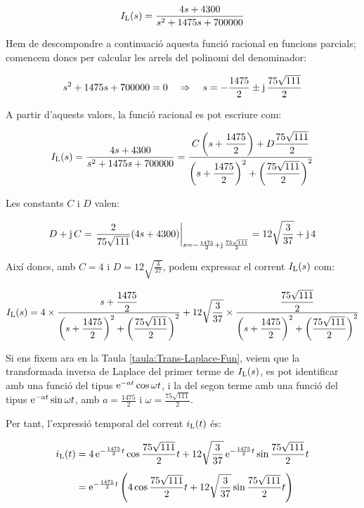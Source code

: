 \begin{exemple}
    \[
    I_\mathrm{L}(s) = \frac{4 s+ 4300}{s^2 +1475 s + 700000}
    \]

    Hem de descompondre a continuació aquesta funció racional en
    funcions parcials; comencem doncs per calcular les arrels del
    polinomi del denominador:

    \[
    s^2 +1475 s + 700000 = 0 \quad\Rightarrow\quad s= -\frac{1475}{2}
    \pm \mathrm{j}\,\frac{75\sqrt{111}}{2}
    \]

    A partir d'aquests valors, la  funció racional es pot escriure com:

    \[
        I_\mathrm{L}(s) =
        \frac{4 s+ 4300}{s^2 +1475 s + 700000} =
        \frac{C\left(s+\dfrac{1475}{2}\right)+D\dfrac{75\sqrt{111}}{2}}
        {\left(s+\dfrac{1475}{2}\right)^2+\left(\dfrac{75\sqrt{111}}{2}\right)^2}
    \]

    Les constants $C$ i $D$ valen:

    \[
    D + \mathrm{j}\,C = \left.\frac{2}{75\sqrt{111}}(4 s
    +4300)\right|_{s=-\frac{1475}{2} + \mathrm{j}\,\frac{75\sqrt{111}}{2}}=
    12\sqrt{\frac{3}{37}} +\mathrm{j}\,4
    \]

    Així doncs, amb $C=4$ i $D=12\sqrt{\frac{3}{37}}$, podem expressar
    el corrent $I_\mathrm{L}(s)$ com:

    \[
        I_\mathrm{L}(s) = 4\times\frac{s+\dfrac{1475}{2}}
        {\left(s+\dfrac{1475}{2}\right)^2+\left(\dfrac{75\sqrt{111}}{2}\right)^2}
        + 12\sqrt{\frac{3}{37}}\times\frac{\dfrac{75\sqrt{111}}{2}}
        {\left(s+\dfrac{1475}{2}\right)^2+\left(\dfrac{75\sqrt{111}}{2}\right)^2}
    \]


     Si ens fixem ara en la Taula \vref{taula:Trans-Laplace-Fun},
    veiem que la transformada inversa de Laplace del primer terme de
    $I_\mathrm{L}(s)$, es pot identificar amb una funció del tipus
    $\mathrm{e}^{-at}\cos\omega t$, i la del segon terme amb una funció del tipus
    $\mathrm{e}^{-at}\sin\omega t$, amb $a=\frac{1475}{2}$ i
    $\omega=\frac{75\sqrt{111}}{2}$.

    Per tant, l'expressió temporal del corrent $i_\mathrm{L}(t)$ és:

    \[\begin{split}
        i_\mathrm{L}(t) &= 4\, \mathrm{e}^{-\frac{1475}{2}t} \cos \frac{75\sqrt{111}}{2} t +
        12\sqrt{\frac{3}{37}}\, \mathrm{e}^{-\frac{1475}{2}t} \sin
        \frac{75\sqrt{111}}{2}t  \\[1ex] &= \mathrm{e}^{-\frac{1475}{2}t} \left( 4
        \cos \frac{75\sqrt{111}}{2} t + 12\sqrt{\frac{3}{37}}\sin
        \frac{75\sqrt{111}}{2}t\right)
    \end{split}\]


\end{exemple}
